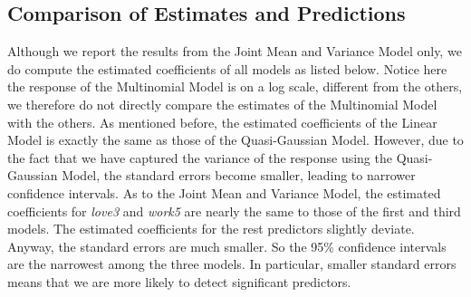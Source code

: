 \documentclass[11pt,letterpaper]{article}
\begin{document}
\subsection{Comparison of Estimates and Predictions}
Although we report the results from the Joint Mean and Variance Model only, we do compute the estimated coefficients of all models as listed below. Notice here the response of the Multinomial Model is on a log scale, different from the others, we therefore do not directly compare the estimates of the Multinomial Model with the others. As mentioned before, the estimated coefficients of the Linear Model is exactly the same as those of the Quasi-Gaussian Model. However, due to the fact that we have captured the variance of the response using the Quasi-Gaussian Model, the standard errors become smaller, leading to narrower confidence intervals. As to the Joint Mean and Variance Model, the estimated coefficients for \emph{love3} and \emph{work5} are nearly the same to those of the first and third models. The estimated coefficients for the rest predictors slightly deviate. Anyway, the standard errors are much smaller. So the 95\% confidence intervals are the narrowest among the three models. In particular, smaller standard errors means that we are more likely to detect significant predictors.
\end{document}
